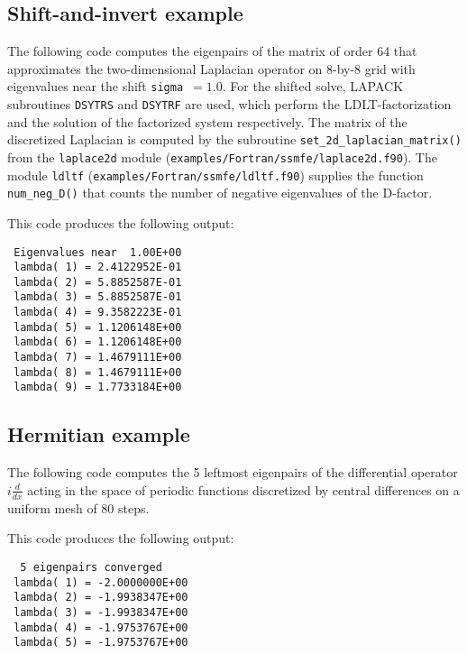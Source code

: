 \subsection{Shift-and-invert example}
\label{sec:ex.si}

The following code 
computes the eigenpairs of 
the matrix of order 64 that approximates 
the two-dimensional Laplacian operator
on 8-by-8 grid
with eigenvalues near the shift {\tt sigma $=1.0$}.
For the shifted solve, LAPACK subroutines {\tt DSYTRS} and
{\tt DSYTRF} are used,
which perform the LDLT-factorization and
the solution of the factorized system respectively.
The matrix of the discretized Laplacian is computed
by the subroutine {\tt set\_2d\_laplacian\_matrix()}
from the {\tt laplace2d} module (\texttt{examples/Fortran/ssmfe/laplace2d.f90}).
The module {\tt ldltf} (\texttt{examples/Fortran/ssmfe/ldltf.f90}) supplies
the function {\tt num\_neg\_D()}
that counts the number of negative eigenvalues of
the D-factor.

This code produces the following output:
\begin{verbatim}
 Eigenvalues near  1.00E+00
 lambda( 1) = 2.4122952E-01
 lambda( 2) = 5.8852587E-01
 lambda( 3) = 5.8852587E-01
 lambda( 4) = 9.3582223E-01
 lambda( 5) = 1.1206148E+00
 lambda( 6) = 1.1206148E+00
 lambda( 7) = 1.4679111E+00
 lambda( 8) = 1.4679111E+00
 lambda( 9) = 1.7733184E+00
\end{verbatim}

\subsection{Hermitian example}
\label{sec:ex.h}

The following code 
computes the 5 leftmost eigenpairs of 
the differential operator $i \frac{d}{dx}$
acting in the space of periodic functions
discretized by central differences on a uniform mesh
of 80 steps.

This code produces the following output:
\begin{verbatim}
  5 eigenpairs converged
 lambda( 1) = -2.0000000E+00
 lambda( 2) = -1.9938347E+00
 lambda( 3) = -1.9938347E+00
 lambda( 4) = -1.9753767E+00
 lambda( 5) = -1.9753767E+00
\end{verbatim}
